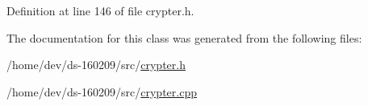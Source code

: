 Definition at line 146 of file crypter.\+h.



The documentation for this class was generated from the following files\+:\begin{DoxyCompactItemize}
\item 
/home/dev/ds-\/160209/src/\hyperlink{crypter_8h}{crypter.\+h}\item 
/home/dev/ds-\/160209/src/\hyperlink{crypter_8cpp}{crypter.\+cpp}\end{DoxyCompactItemize}

